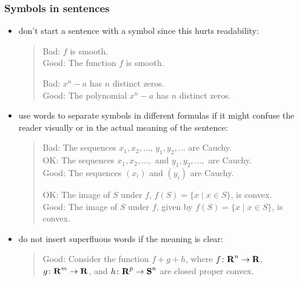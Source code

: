 \documentclass[usepdftitle=false]{beamer}
\begin{document}
\begin{frame}
    \frametitle{Symbols in sentences}

    \begin{itemize}\itemsep=10pt
        \item don't start a sentence with a symbol since this hurts readability:
            \begin{quote}
                Bad: $f$ is smooth.\\
                Good: The function $f$ is smooth.

                Bad: $x^n - a$ has $n$ distinct zeros. \\
                Good: The polynomial $x^n - a$ has $n$ distinct zeros.
            \end{quote}
        \item use words to separate symbols in different formulas if it might confuse the reader visually or in the actual meaning of the sentence:
            \begin{quote}
                Bad: The sequences $x_1, x_2, \dots$, $y_1, y_2, \dots$ are Cauchy. \\
                OK: The sequences $x_1, x_2, \dots,$ and $y_1, y_2, \dots,$ are Cauchy. \\
                Good: The sequences $(x_i)$ and $(y_i)$ are Cauchy.

                OK: The image of $S$ under $f$, $f(S) = \{ x \mid x \in S \}$, is convex. \\
                Good: The image of $S$ under $f$, given by $f(S) = \{ x \mid x \in S \}$, is convex.
            \end{quote}
        \item do not insert superfluous words if the meaning is clear:
            \begin{quote}
                Good: Consider the function $f + g + h$, where $f \colon {\bf R{}}^n \to {\bf R{}}$, $g \colon {\bf R{}}^m \to {\bf R{}}$, and $h \colon {\bf R{}}^p \to {\bf S{}}^n$ are closed proper convex.
            \end{quote}
    \end{itemize}
\end{frame}
\end{document}

